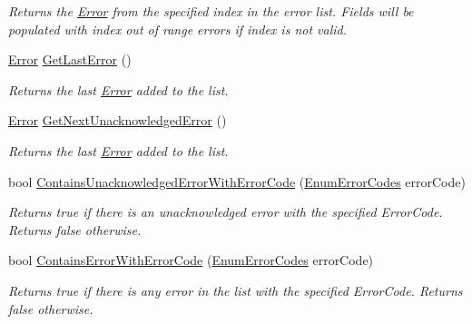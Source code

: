 \begin{DoxyCompactItemize}
\begin{DoxyCompactList}\small\item\em Returns the \mbox{\hyperlink{class_c_s_i_1_1_library_1_1_errors_1_1_error}{Error}} from the specified index in the error list. Fields will be populated with index out of range errors if index is not valid. \end{DoxyCompactList}\item 
\mbox{\hyperlink{class_c_s_i_1_1_library_1_1_errors_1_1_error}{Error}} \mbox{\hyperlink{class_c_s_i_1_1_library_1_1_errors_1_1_error_list_ae27914b1f1d58e41cc39cd4ec978a1b5}{Get\+Last\+Error}} ()
\begin{DoxyCompactList}\small\item\em Returns the last \mbox{\hyperlink{class_c_s_i_1_1_library_1_1_errors_1_1_error}{Error}} added to the list. \end{DoxyCompactList}\item 
\mbox{\hyperlink{class_c_s_i_1_1_library_1_1_errors_1_1_error}{Error}} \mbox{\hyperlink{class_c_s_i_1_1_library_1_1_errors_1_1_error_list_af489d3e731d11a389d011990ee3a9915}{Get\+Next\+Unacknowledged\+Error}} ()
\begin{DoxyCompactList}\small\item\em Returns the last \mbox{\hyperlink{class_c_s_i_1_1_library_1_1_errors_1_1_error}{Error}} added to the list. \end{DoxyCompactList}\item 
bool \mbox{\hyperlink{class_c_s_i_1_1_library_1_1_errors_1_1_error_list_a03ec1010e102319969485963a724f838}{Contains\+Unacknowledged\+Error\+With\+Error\+Code}} (\mbox{\hyperlink{namespace_c_s_i_1_1_library_1_1_errors_a5534735de1ef2256eb4c52c7440e30d7}{Enum\+Error\+Codes}} error\+Code)
\begin{DoxyCompactList}\small\item\em Returns true if there is an unacknowledged error with the specified Error\+Code. Returns false otherwise. \end{DoxyCompactList}\item 
bool \mbox{\hyperlink{class_c_s_i_1_1_library_1_1_errors_1_1_error_list_a476d28bd130fefa2fcdf73acd4552646}{Contains\+Error\+With\+Error\+Code}} (\mbox{\hyperlink{namespace_c_s_i_1_1_library_1_1_errors_a5534735de1ef2256eb4c52c7440e30d7}{Enum\+Error\+Codes}} error\+Code)
\begin{DoxyCompactList}\small\item\em Returns true if there is any error in the list with the specified Error\+Code. Returns false otherwise. \end{DoxyCompactList}\item 

\end{DoxyCompactItemize}
